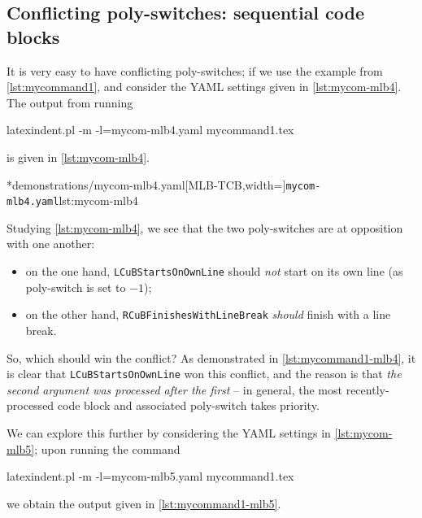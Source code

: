 \subsection{Conflicting poly-switches: sequential code blocks}
	It is very easy to have conflicting poly-switches; if we use the example from
	\vref{lst:mycommand1}, and consider the YAML settings given in \cref{lst:mycom-mlb4}. The
	output from running
	\begin{commandshell}
latexindent.pl -m -l=mycom-mlb4.yaml mycommand1.tex
\end{commandshell}
	is given in \cref{lst:mycom-mlb4}.

	\begin{cmhtcbraster}
		\cmhlistingsfromfile[style=yaml-LST]*{demonstrations/mycom-mlb4.yaml}[MLB-TCB,width=\linewidth]{\texttt{mycom-mlb4.yaml}}{lst:mycom-mlb4}
	\end{cmhtcbraster}

	Studying \cref{lst:mycom-mlb4}, we see that the two poly-switches are at opposition with
	one another:
	\begin{itemize}
		\item on the one hand, \texttt{LCuBStartsOnOwnLine} should \emph{not} start on its own line (as
		      poly-switch is set to $-1$);
		\item on the other hand, \texttt{RCuBFinishesWithLineBreak} \emph{should} finish with a line
		      break.
	\end{itemize}
	So, which should win the conflict? As demonstrated in \cref{lst:mycommand1-mlb4}, it is
	clear that \texttt{LCuBStartsOnOwnLine} won this conflict, and the reason is that
	\emph{the second argument was processed after the first} -- in general, the most
	recently-processed code block and associated poly-switch takes priority.

	We can explore this further by considering the YAML settings in \cref{lst:mycom-mlb5};
	upon running the command
	\begin{commandshell}
latexindent.pl -m -l=mycom-mlb5.yaml mycommand1.tex
\end{commandshell}
	we obtain the output given in \cref{lst:mycommand1-mlb5}.

